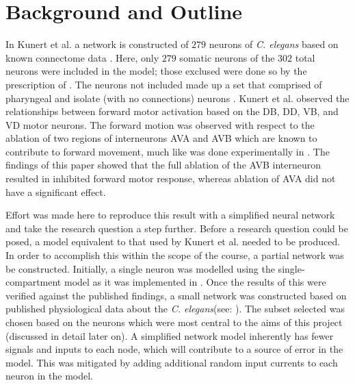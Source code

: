 \documentclass[11pt]{article} %
\begin{document}
\section{Background and Outline}
In Kunert et al. \cite{Kunert2014} a network is constructed of $279$ neurons of \emph{C. elegans} based on known connectome data \cite{Varshney2011}. Here, only $279$ somatic neurons of the $302$ total neurons \cite{Sulston1977} were included in the model; those exclused were done so by the prescription of \cite{Varshney2011}. The neurons not included made up a set that comprised of pharyngeal and isolate (with no connections) neurons \cite{Varshney2011}. Kunert et al. observed the relationships between forward motor activation based on the DB, DD, VB, and VD motor neurons. The forward motion was observed with respect to the ablation of two regions of interneurons AVA and AVB \cite{Kunert 2014} which are known to contribute to forward movement, much like was done experimentally in \cite{Chalfie1985}. The findings of this paper showed that the full ablation of the AVB interneuron resulted in inhibited forward motor response, whereas ablation of AVA did not have a significant effect.

Effort was made here to reproduce this result with a simplified neural network and take the research question a step further. Before a research question could be posed, a model equivalent to that used by Kunert et al. needed to be produced. In order to accomplish this within the scope of the course, a partial network was be constructed. Initially, a single neuron was modelled using the single-compartment model \cite{Wicks1996a} as it was implemented in \cite{Kunert2014}. Once the results of this were verified against the published findings, a small network was constructed based on published physiological data about the \emph{C. elegans}(see: \cite{Wicks1996a, Varshney2011, Sulston1977, Oshio2003}). The subset selected was chosen based on the neurons which were most central to the aims of this project (discussed in detail later on). A simplified network model inherently has fewer signals and inputs to each node, which will contribute to a source of error in the model. This was mitigated by adding additional random input currents to each neuron in the model.
\end{document}
